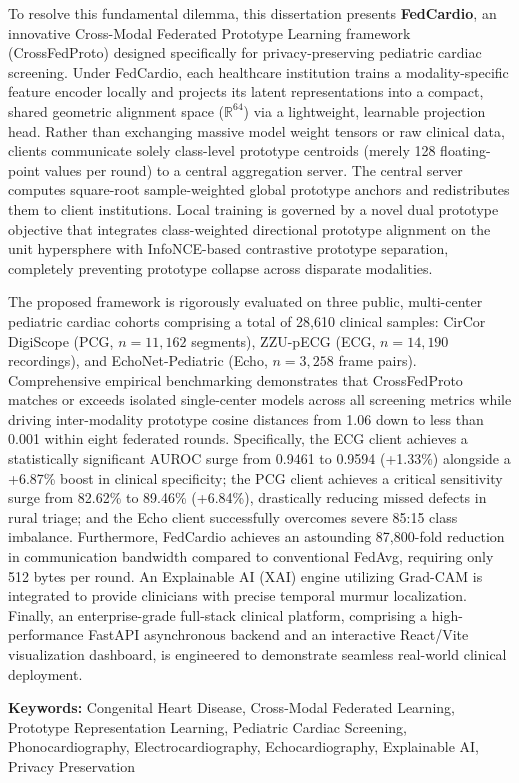 \documentclass[12pt,a4paper]{amritareport}
\begin{document}
{	To resolve this fundamental dilemma, this dissertation presents \textbf{FedCardio}, an innovative Cross-Modal Federated Prototype Learning framework (CrossFedProto) designed specifically for privacy-preserving pediatric cardiac screening. Under FedCardio, each healthcare institution trains a modality-specific feature encoder locally and projects its latent representations into a compact, shared geometric alignment space ($\mathbb{R}^{64}$) via a lightweight, learnable projection head. Rather than exchanging massive model weight tensors or raw clinical data, clients communicate solely class-level prototype centroids (merely 128 floating-point values per round) to a central aggregation server. The central server computes square-root sample-weighted global prototype anchors and redistributes them to client institutions. Local training is governed by a novel dual prototype objective that integrates class-weighted directional prototype alignment on the unit hypersphere with InfoNCE-based contrastive prototype separation, completely preventing prototype collapse across disparate modalities.

	The proposed framework is rigorously evaluated on three public, multi-center pediatric cardiac cohorts comprising a total of 28,610 clinical samples: CirCor DigiScope (PCG, $n=11,162$ segments), ZZU-pECG (ECG, $n=14,190$ recordings), and EchoNet-Pediatric (Echo, $n=3,258$ frame pairs). Comprehensive empirical benchmarking demonstrates that CrossFedProto matches or exceeds isolated single-center models across all screening metrics while driving inter-modality prototype cosine distances from 1.06 down to less than 0.001 within eight federated rounds. Specifically, the ECG client achieves a statistically significant AUROC surge from 0.9461 to 0.9594 (+1.33\%) alongside a +6.87\% boost in clinical specificity; the PCG client achieves a critical sensitivity surge from 82.62\% to 89.46\% (+6.84\%), drastically reducing missed defects in rural triage; and the Echo client successfully overcomes severe 85:15 class imbalance. Furthermore, FedCardio achieves an astounding 87,800-fold reduction in communication bandwidth compared to conventional FedAvg, requiring only 512 bytes per round. An Explainable AI (XAI) engine utilizing Grad-CAM is integrated to provide clinicians with precise temporal murmur localization. Finally, an enterprise-grade full-stack clinical platform, comprising a high-performance FastAPI asynchronous backend and an interactive React/Vite visualization dashboard, is engineered to demonstrate seamless real-world clinical deployment.

	\noindent\textbf{Keywords:} Congenital Heart Disease, Cross-Modal Federated Learning, Prototype Representation Learning, Pediatric Cardiac Screening, Phonocardiography, Electrocardiography, Echocardiography, Explainable AI, Privacy Preservation
}
\end{document}

